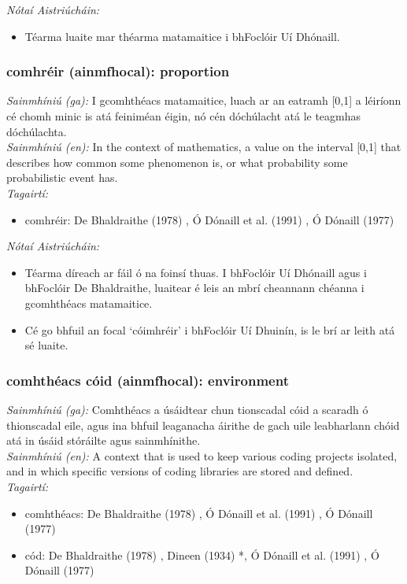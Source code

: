  \noindent \textit{Nótaí Aistriúcháin:}
\begin{itemize}
	\item Téarma luaite mar théarma matamaitice i bhFoclóir Uí Dhónaill.
\end{itemize}


\subsubsection*{comhréir (ainmfhocal): proportion}
 \noindent \textit{Sainmhíniú (ga):} I gcomhthéacs matamaitice, luach ar an eatramh [0,1] a léiríonn cé chomh minic is atá feiniméan éigin, nó cén dóchúlacht atá le teagmhas dóchúlachta.
\\
 \noindent \textit{Sainmhíniú (en):} In the context of mathematics, a value on the interval [0,1] that describes how common some phenomenon is, or what probability some probabilistic event has.
\\
 \noindent \textit{Tagairtí:}
\begin{itemize}
	\item comhréir: De Bhaldraithe (1978) \cite{de-bhaldraithe}, Ó Dónaill et al. (1991) \cite{focloir-beag}, Ó Dónaill (1977) \cite{odonaill}
\end{itemize}

 \noindent \textit{Nótaí Aistriúcháin:}
\begin{itemize}
	\item Téarma díreach ar fáil ó na foinsí thuas. I bhFoclóir Uí Dhónaill agus i bhFoclóir De Bhaldraithe, luaitear é leis an mbrí cheannann chéanna i gcomhthéacs matamaitice.
	\item Cé go bhfuil an focal `cóimhréir' i bhFoclóir Uí Dhuinín, is le brí ar leith atá sé luaite.
\end{itemize}


\subsubsection*{comhthéacs cóid (ainmfhocal): environment}
 \noindent \textit{Sainmhíniú (ga):} Comhthéacs a úsáidtear chun tionscadal cóid a scaradh ó thionscadal eile, agus ina bhfuil leaganacha áirithe de gach uile leabharlann chóid atá in úsáid stóráilte agus sainmhínithe.
\\
 \noindent \textit{Sainmhíniú (en):} A context that is used to keep various coding projects isolated, and in which specific versions of coding libraries are stored and defined.
\\
 \noindent \textit{Tagairtí:}
\begin{itemize}
	\item comhthéacs: De Bhaldraithe (1978) \cite{de-bhaldraithe}, Ó Dónaill et al. (1991) \cite{focloir-beag}, Ó Dónaill (1977) \cite{odonaill}
	\item cód: De Bhaldraithe (1978) \cite{de-bhaldraithe}, Dineen (1934) \cite{dineen}*, Ó Dónaill et al. (1991) \cite{focloir-beag}, Ó Dónaill (1977) \cite{odonaill}
\end{itemize}

